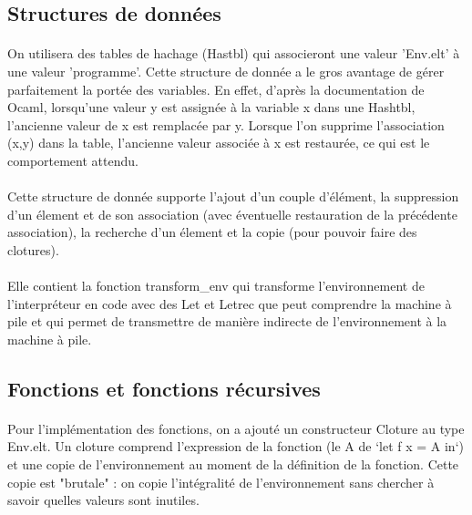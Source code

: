 \subsection{Structures de données}

\paragraph{} On utilisera des tables de hachage (Hastbl) qui associeront une valeur 'Env.elt' à une valeur 'programme'. Cette structure de donnée a le gros avantage de gérer parfaitement la portée des variables. En effet, d'après la documentation de Ocaml, lorsqu'une valeur y est assignée à la variable x dans une Hashtbl, l'ancienne valeur de x est remplacée par y. Lorsque l'on supprime l'association (x,y) dans la table, l'ancienne valeur associée à x est restaurée, ce qui est le comportement attendu.

\paragraph{} Cette structure de donnée supporte l'ajout d'un couple d'élément, la suppression d'un élement et de son association (avec éventuelle restauration de la précédente association), la recherche d'un élement et la copie (pour pouvoir faire des clotures).

\paragraph{} Elle contient la fonction transform\_env qui transforme l'environnement de l'interpréteur en code avec des Let et Letrec que peut comprendre la machine à pile et qui permet de transmettre de manière indirecte de l'environnement à la machine à pile.

\subsection{Fonctions et fonctions récursives}

\paragraph{} Pour l'implémentation des fonctions, on a ajouté un constructeur Cloture au type Env.elt.  Un cloture comprend l'expression de la fonction (le A de `let f x = A in`) et une copie de l'environnement au moment de la définition de la fonction. Cette copie est "brutale" : on copie l'intégralité de l'environnement sans chercher à savoir quelles valeurs sont inutiles.

